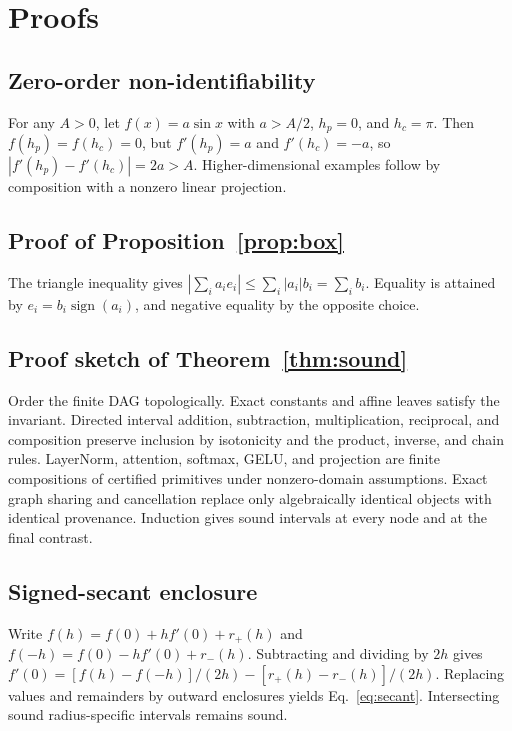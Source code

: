 \documentclass{article}
\begin{document}



\appendix
\section{Proofs}
\label{app:proofs}

\subsection{Zero-order non-identifiability}
For any $A>0$, let $f(x)=a\sin x$ with $a>A/2$, $h_p=0$, and $h_c=\pi$. Then $f(h_p)=f(h_c)=0$, but $f'(h_p)=a$ and $f'(h_c)=-a$, so $|f'(h_p)-f'(h_c)|=2a>A$. Higher-dimensional examples follow by composition with a nonzero linear projection.

\subsection{Proof of Proposition~\ref{prop:box}}
The triangle inequality gives $|\sum_i a_i e_i|\le\sum_i|a_i|b_i=\sum_i b_i$. Equality is attained by $e_i=b_i\operatorname{sign}(a_i)$, and negative equality by the opposite choice.

\subsection{Proof sketch of Theorem~\ref{thm:sound}}
Order the finite DAG topologically. Exact constants and affine leaves satisfy the invariant. Directed interval addition, subtraction, multiplication, reciprocal, and composition preserve inclusion by isotonicity and the product, inverse, and chain rules. LayerNorm, attention, softmax, GELU, and projection are finite compositions of certified primitives under nonzero-domain assumptions. Exact graph sharing and cancellation replace only algebraically identical objects with identical provenance. Induction gives sound intervals at every node and at the final contrast.

\subsection{Signed-secant enclosure}
Write $f(h)=f(0)+hf'(0)+r_+(h)$ and $f(-h)=f(0)-hf'(0)+r_-(h)$. Subtracting and dividing by $2h$ gives $f'(0)=[f(h)-f(-h)]/(2h)-[r_+(h)-r_-(h)]/(2h)$. Replacing values and remainders by outward enclosures yields Eq.~\ref{eq:secant}. Intersecting sound radius-specific intervals remains sound.
\end{document}
